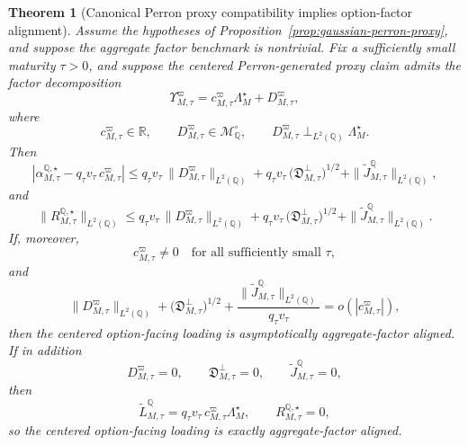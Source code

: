 \documentclass[11pt,a4paper]{amsart}
\theoremstyle{plain}
\newtheorem{theorem}{Theorem}[section]
\theoremstyle{definition}
\theoremstyle{remark}
\newcommand{\R}{\mathbb{R}}
\newcommand{\QQ}{\mathbb{Q}}
\newcommand{\cM}{\mathcal{M}}
\begin{document}
\begin{theorem}[Canonical Perron proxy compatibility implies option-factor alignment]\label{thm:gaussian-proxy-factor}
Assume the hypotheses of Proposition~\ref{prop:gaussian-perron-proxy}, and suppose the aggregate
factor benchmark is nontrivial.  Fix a sufficiently small maturity \(\tau>0\), and suppose the
centered Perron-generated proxy claim admits the factor decomposition
\[
        \Upsilon_{M,\tau}^\varpi
        =
        c_{M,\tau}^\varpi\Lambda_M^\star
        +
        D_{M,\tau}^\varpi,
\]
where
\[
        c_{M,\tau}^\varpi\in\R,
        \qquad
        D_{M,\tau}^\varpi\in\cM_\QQ^\circ,
        \qquad
        D_{M,\tau}^\varpi\perp_{L^2(\QQ)}\Lambda_M^\star.
\]
Then
\[
        \left|
                \alpha_{M,\tau}^{\QQ,\star}
                -
                q_\tau v_\tau\,c_{M,\tau}^\varpi
        \right|
        \le
        q_\tau v_\tau\,\|D_{M,\tau}^\varpi\|_{L^2(\QQ)}
        +
        q_\tau v_\tau\,\bigl(\mathfrak D_{M,\tau}^\perp\bigr)^{1/2}
        +
        \|\widetilde J_{M,\tau}^\QQ\|_{L^2(\QQ)},
\]
and
\[
        \|R_{M,\tau}^{\QQ,\star}\|_{L^2(\QQ)}
        \le
        q_\tau v_\tau\,\|D_{M,\tau}^\varpi\|_{L^2(\QQ)}
        +
        q_\tau v_\tau\,\bigl(\mathfrak D_{M,\tau}^\perp\bigr)^{1/2}
        +
        \|\widetilde J_{M,\tau}^\QQ\|_{L^2(\QQ)}.
\]
If, moreover,
\[
        c_{M,\tau}^\varpi\neq0
        \quad\text{for all sufficiently small }\tau,
\]
and
\[
        \|D_{M,\tau}^\varpi\|_{L^2(\QQ)}
        +
        \bigl(\mathfrak D_{M,\tau}^\perp\bigr)^{1/2}
        +
        \frac{\|\widetilde J_{M,\tau}^\QQ\|_{L^2(\QQ)}}{q_\tau v_\tau}
        =
        o\!\left(|c_{M,\tau}^\varpi|\right),
\]
then the centered option-facing loading is asymptotically aggregate-factor aligned.  If in
addition
\[
        D_{M,\tau}^\varpi=0,
        \qquad
        \mathfrak D_{M,\tau}^\perp=0,
        \qquad
        \widetilde J_{M,\tau}^\QQ=0,
\]
then
\[
        \widetilde L_{M,\tau}^\QQ
        =
        q_\tau v_\tau\,c_{M,\tau}^\varpi\Lambda_M^\star,
        \qquad
        R_{M,\tau}^{\QQ,\star}=0,
\]
so the centered option-facing loading is exactly aggregate-factor aligned.
\end{theorem}
\end{document}
